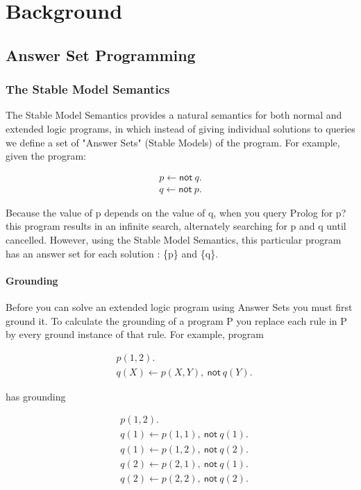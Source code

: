\chapter{Background}

\section{Answer Set Programming}

\subsection{The Stable Model Semantics}

The Stable Model Semantics provides a natural semantics for both normal and extended logic programs, in which instead of giving individual solutions to queries we define a set of "Answer Sets" (Stable Models) of the program. For example, given the program:

\begin{align*}
p \gets \textsf{not} \: q. \\
q \gets \textsf{not} \: p. 
\end{align*}

Because the value of p depends on the value of q, when you query Prolog for p? this program results in an infinite search, alternately searching for p and q until cancelled. However, using the Stable Model Semantics, this particular program has an answer set for each solution : \{p\} and \{q\}.

\subsubsection{Grounding}

Before you can solve an extended logic program using Answer Sets you must first ground it. To calculate the grounding of a program P you replace each rule in P by every ground instance of that rule. For example, program 

\begin{align*}
&p(1,2). \\
&q(X) \gets p(X, Y), \: \textsf{not} \: q(Y).
\end{align*}

has grounding

\begin{align*}
&p(1,2). \\
&q(1) \gets p(1, 1), \: \textsf{not} \: q(1). \\
&q(1) \gets p(1, 2), \: \textsf{not} \: q(2). \\
&q(2) \gets p(2, 1), \: \textsf{not} \: q(1). \\
&q(2) \gets p(2, 2), \: \textsf{not} \: q(2).
\end{align*}

